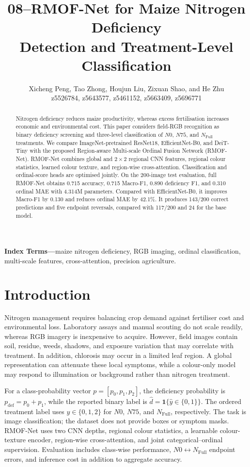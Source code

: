 \documentclass[10pt,letterpaper,twocolumn]{article}
\title{\vspace{-0.25in}\bfseries 08--RMOF-Net for Maize Nitrogen Deficiency\\[-1pt]
Detection and Treatment-Level Classification\vspace{-0.08in}}
\author{\normalsize Xicheng Peng, Tao Zhong, Houjun Liu, Zixuan Shao, and He Zhu\\[-1pt]
\small z5526784, z5643577, z5461152, z5663409, z5696771}
\date{}
\newcommand{\Nzero}{$N0$}
\newcommand{\Nmid}{$N75$}
\newcommand{\Nfull}{$N_{\mathrm{Full}}$}
\newcommand{\method}{RMOF-Net}
\begin{document}
\maketitle
\vspace{-0.22in}

\begin{abstract}
Nitrogen deficiency reduces maize productivity, whereas excess fertilisation increases economic and environmental cost. This paper considers field-RGB recognition as binary deficiency screening and three-level classification of \Nzero, \Nmid, and \Nfull treatments. We compare ImageNet-pretrained ResNet18, EfficientNet-B0, and DeiT-Tiny with the proposed Region-aware Multi-scale Ordinal Fusion Network (\method). \method{} combines global and $2\!\times\!2$ regional CNN features, regional colour statistics, learned colour texture, and region-wise cross-attention. Classification and ordinal-score heads are optimised jointly. On the 200-image test evaluation, full \method{} obtains 0.715 accuracy, 0.715 Macro-F1, 0.890 deficiency F1, and 0.310 ordinal MAE with 4.314M parameters. Compared with EfficientNet-B0, it improves Macro-F1 by 0.130 and reduces ordinal MAE by 42.1\%. It produces 143/200 correct predictions and five endpoint reversals, compared with 117/200 and 24 for the base model.
\end{abstract}

\noindent\textbf{Index Terms---}maize nitrogen deficiency, RGB imaging, ordinal classification, multi-scale features, cross-attention, precision agriculture.

\section{Introduction}

Nitrogen management requires balancing crop demand against fertiliser cost and environmental loss. Laboratory assays and manual scouting do not scale readily, whereas RGB imagery is inexpensive to acquire. However, field images contain soil, residue, weeds, shadows, and exposure variation that may correlate with treatment. In addition, chlorosis may occur in a limited leaf region. A global representation can attenuate these local symptoms, while a colour-only model may respond to illumination or background rather than nitrogen treatment.

For a class-probability vector $p=[p_0,p_1,p_2]$, the deficiency probability is $p_{\mathrm{def}}=p_0+p_1$, while the reported binary label is $\hat d=\mathbf{1}\{\hat y\in\{0,1\}\}$. The ordered treatment label uses $y\in\{0,1,2\}$ for \Nzero, \Nmid, and \Nfull, respectively. The task is image classification; the dataset does not provide boxes or symptom masks. \method{} uses two CNN depths, regional colour statistics, a learnable colour-texture encoder, region-wise cross-attention, and joint categorical--ordinal supervision. Evaluation includes class-wise performance, \Nzero$\leftrightarrow$\Nfull{} endpoint errors, and inference cost in addition to aggregate accuracy.
\end{document}
